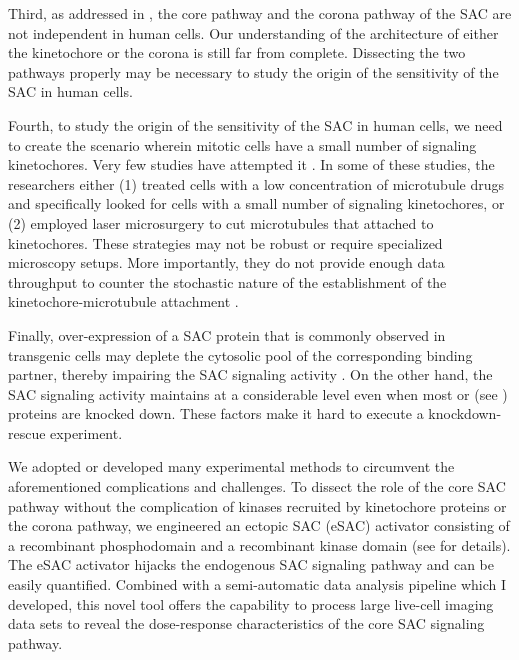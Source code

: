 Third, as addressed in , the core pathway and the corona pathway of the SAC are not independent in human cells. Our understanding of the architecture of either the kinetochore or the corona is still far from complete. Dissecting the two pathways properly may be necessary to study the origin of the sensitivity of the SAC in human cells.

Fourth, to study the origin of the sensitivity of the SAC in human cells, we need to create the scenario wherein mitotic cells have a small number of signaling kinetochores. Very few studies have attempted it \cite{RiederNormalProgression, Rheostat, Ablation}. In some of these studies, the researchers either (1) treated cells with a low concentration of microtubule drugs and specifically looked for cells with a small number of signaling kinetochores, or (2) employed laser microsurgery to cut microtubules that attached to kinetochores. These strategies may not be robust or require specialized microscopy setups. More importantly, they do not provide enough data throughput to counter the stochastic nature of the establishment of the kinetochore-microtubule attachment \cite{GradualStochastic}.

Finally, over-expression of a SAC protein that is commonly observed in transgenic cells may deplete the cytosolic pool of the corresponding binding partner, thereby impairing the SAC signaling activity \cite{Bub3Competition, FissionYeastSACRobustness, ATMPhosphorylatesMad1S214, MAD1Overexpression_Ryan2012}. On the other hand, the SAC signaling activity maintains at a considerable level even when most  \cite{Raaijmakers2018, RZZ-MAD1vsBUB1-MAD1_2018, siROD_Zhang2019} or  (see ) proteins are knocked down. These factors make it hard to execute a knockdown-rescue experiment.

We adopted or developed many experimental methods to circumvent the aforementioned complications and challenges. To dissect the role of the core SAC pathway without the complication of kinases recruited by kinetochore proteins or the corona pathway, we engineered an ectopic SAC (eSAC) activator consisting of a recombinant  phosphodomain and a recombinant  kinase domain (see  for details). The eSAC activator hijacks the endogenous SAC signaling pathway and can be easily quantified. Combined with a semi-automatic data analysis pipeline which I developed, this novel tool offers the capability to process large live-cell imaging data sets to reveal the dose-response characteristics of the core SAC signaling pathway.

